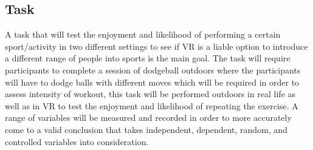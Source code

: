 \documentclass{sigchi}
\begin{document}
\subsection{Task}

A task that will test the enjoyment and likelihood of performing a certain sport/activity in two different settings to see if VR is a liable option to introduce a different range of people into sports is the main goal. The task will require participants to complete a session of dodgeball outdoors where the participants will have to dodge balls with different moves which will be required in order to assess intensity of workout, this task will be performed outdoors in real life as well as in VR to test the enjoyment and likelihood of repeating the exercise. A range of variables will be measured and recorded in order to more accurately come to a valid conclusion that takes independent, dependent, random, and controlled variables into consideration.


\balance{}

\balance{}



\end{document}
